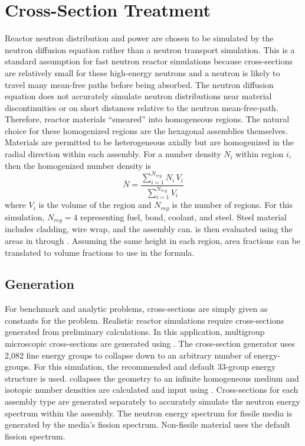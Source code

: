 \section{Cross-Section Treatment}
  \label{sec:cross_section_treatment}
  Reactor neutron distribution and power are chosen to be simulated by the
  neutron diffusion equation rather than a neutron transport simulation. This is
  a standard assumption for fast neutron reactor simulations because
  cross-sections are relatively small for these high-energy neutrons and a
  neutron is likely to travel many mean-free paths before being absorbed. The
  neutron diffusion equation does not accurately simulate neutron distributions
  near material discontinuities or on short distances relative to the neutron
  mean-free-path. Therefore, reactor materials ``smeared'' into homogeneous
  regions. The natural choice for these homogenized regions are the hexagonal
  assemblies themselves. Materials are permitted to be heterogeneous axially but
  are homogenized in the radial direction within each assembly. For a number
  density $N_i$ within region $i$, then the homogenized number density is
  \begin{equation}
    \label{eq:homogenized_nden}
    \overline{N} = \frac{\sum_{i = 1}^{N_{reg}} N_i \, V_i}
      {\sum_{i=1}^{N_{reg}} V_i}
  \end{equation}
  where $V_i$ is the volume of the region and $N_{reg}$ is the number of
  regions. For this simulation, ${N_{reg}=4}$ representing fuel, bond, coolant,
  and steel. Steel material includes cladding, wire wrap, and the assembly can.
   is then evaluated using the areas in
   through . Assuming the same height
  in each region, area fractions can be translated to volume fractions to use in
  the formula.

  \subsection{Generation}
    For benchmark and analytic problems, cross-sections are simply given as
    constants for the problem. Realistic reactor simulations require
    cross-sections generated from preliminary calculations. In this
    application, multigroup microscopic cross-sections are generated using 
    \mcc \cite{mcc}.
    The cross-section generator uses 2,082 fine energy groups to collapse down
    to an arbitrary number of energy-groups. For this simulation, the
    recommended and default 33-group energy structure is used. \mcc 
    collapses the geometry to an infinite homogeneous medium and isotopic number
    densities are calculated and input using .
    Cross-sections for each assembly type are generated separately to accurately
    simulate the neutron energy spectrum within the assembly. The neutron energy
    spectrum for fissile media is generated by the media's fission spectrum. 
    Non-fissile material uses the default  fission spectrum. 

